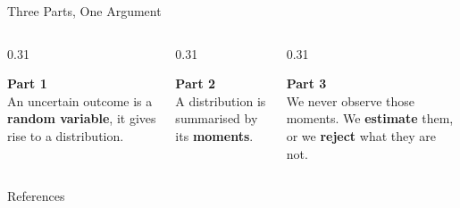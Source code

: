 \documentclass[9pt,english,aspectratio=169]{beamer}
\begin{document}
\begin{frame}{Three Parts, One Argument}

  \vspace{0.6em}
  \begin{columns}[T]
    \begin{column}{0.31\textwidth}
      \begin{methodbox}
        \textbf{Part 1} \\[0.3em]
        {\small An uncertain outcome is a \textbf{random variable}, it gives rise to  a distribution.}
      \end{methodbox}
    \end{column}
    \begin{column}{0.31\textwidth}
      \begin{methodbox}
        \textbf{Part 2} \\[0.3em]
        {\small A distribution is summarised by its \textbf{moments}. }
      \end{methodbox}
    \end{column}
    \begin{column}{0.31\textwidth}
      \begin{methodbox}
        \textbf{Part 3} \\[0.3em]
        {\small We never observe those moments. We \textbf{estimate} them, or we \textbf{reject} what they are not.}
      \end{methodbox}
    \end{column}
  \end{columns}

\end{frame}

\begin{frame}{References}
  \footnotesize
  \nocite{Harvey2016_crosssection}
  \nocite{Frazzini2018_buffett}
  
\end{frame}


\appendix
\end{document}
